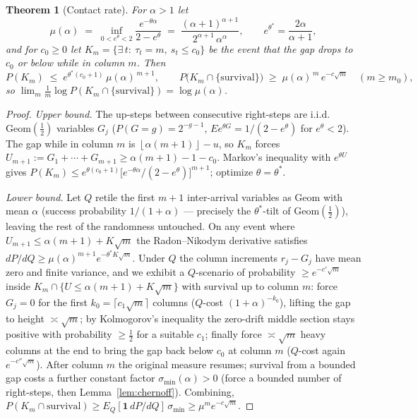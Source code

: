 \documentclass[11pt]{article}
\newtheorem{theorem}{Theorem}
\theoremstyle{definition}
\theoremstyle{remark}
\newcommand{\floor}[1]{\left\lfloor #1 \right\rfloor}
\begin{document}
\begin{theorem}[Contact rate]\label{thm:rate}
For $\alpha > 1$ let
\[
\mu(\alpha) \;=\; \inf_{0 < e^\theta < 2}
\frac{e^{-\theta\alpha}}{2 - e^{\theta}}
\;=\; \frac{(\alpha+1)^{\alpha+1}}{2^{\alpha+1}\,\alpha^{\alpha}},
\qquad e^{\theta^*} = \frac{2\alpha}{\alpha + 1},
\]
and for $c_0 \geq 0$ let
$K_m = \{\exists\, t:\ \tau_t = m,\ s_t \leq c_0\}$ be the event that
the gap drops to $c_0$ or below while in column $m$.
Then
\[
P(K_m) \;\leq\; e^{\theta^*(c_0 + 1)}\,\mu(\alpha)^{\,m+1},
\qquad
P\bigl(K_m \cap \{\text{survival}\}\bigr) \;\geq\;
\mu(\alpha)^{\,m}\, e^{-c\sqrt{m}} \quad (m \geq m_0),
\]
so $\lim_m \frac{1}{m}\log P(K_m \cap \{\text{survival}\}) = \log
\mu(\alpha)$.
\end{theorem}

\begin{proof}
\emph{Upper bound.}
The up-steps between consecutive right-steps are i.i.d.\
$\mathrm{Geom}(\tfrac12)$ variables $G_j$ ($P(G = g) = 2^{-g-1}$,
$E e^{\theta G} = 1/(2 - e^\theta)$ for $e^\theta < 2$).
The gap while in column $m$ is $\floor{\alpha(m+1)} - u$, so $K_m$
forces $U_{m+1} := G_1 + \cdots + G_{m+1} \geq \alpha(m+1) - 1 - c_0$.
Markov's inequality with $e^{\theta U}$ gives
$P(K_m) \leq e^{\theta(c_0 + 1)}\bigl[e^{-\theta\alpha}/(2 -
e^\theta)\bigr]^{m+1}$; optimize $\theta = \theta^*$.

\emph{Lower bound.}
Let $Q$ retile the first $m+1$ inter-arrival variables as
$\mathrm{Geom}$ with mean $\alpha$ (success probability
$1/(1+\alpha)$ --- precisely the $\theta^*$-tilt of
$\mathrm{Geom}(\tfrac12)$), leaving the rest of the randomness
untouched.
On any event where $U_{m+1} \leq \alpha(m+1) + K\sqrt{m}$ the
Radon--Nikodym derivative satisfies
$dP/dQ \geq \mu(\alpha)^{m+1} e^{-\theta^* K\sqrt{m}}$.
Under $Q$ the column increments $r_j - G_j$ have mean zero and finite
variance, and we exhibit a $Q$-scenario of probability
$\geq e^{-c'\sqrt{m}}$ inside $K_m \cap \{U \leq \alpha(m+1) +
K\sqrt{m}\}$ with survival up to column $m$:
force $G_j = 0$ for the first $k_0 = \lceil c_1\sqrt{m}\rceil$ columns
($Q$-cost $(1+\alpha)^{-k_0}$), lifting the gap to height
$\asymp \sqrt{m}$; by Kolmogorov's inequality the zero-drift middle
section stays positive with probability $\geq \tfrac12$ for a suitable
$c_1$; finally force $\asymp \sqrt{m}$ heavy columns at the end to
bring the gap back below $c_0$ at column $m$ ($Q$-cost again
$e^{-c''\sqrt{m}}$).
After column $m$ the original measure resumes; survival from a
bounded gap costs a further constant factor
$\sigma_{\min}(\alpha) > 0$ (force a bounded number of right-steps,
then Lemma~\ref{lem:chernoff}).
Combining, $P(K_m \cap \text{survival}) \geq
E_Q[\mathbf{1}\,dP/dQ]\,\sigma_{\min} \geq \mu^{m} e^{-c\sqrt{m}}$.
\end{proof}
\end{document}
